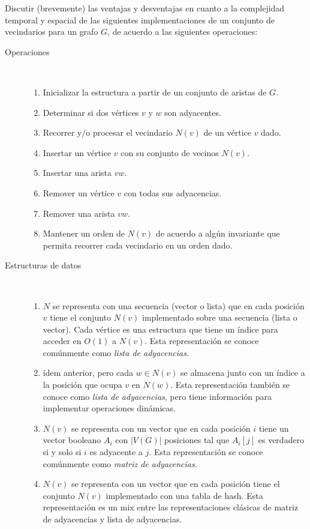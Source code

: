 

 \item\Obligatorio Discutir (brevemente) las ventajas y desventajas en cuanto a la complejidad temporal y espacial de las siguientes implementaciones de un conjunto de vecindarios para un grafo $G$, de acuerdo a las siguientes operaciones:
 \begin{description}
  \item [Operaciones] ~
  \begin{enumerate}
   \item Inicializar la estructura a partir de un conjunto de aristas de $G$.
   \item Determinar si dos vértices $v$ y $w$ son adyacentes.
   \item Recorrer y/o procesar el vecindario $N(v)$ de un vértice $v$ dado.
   \item Insertar un vértice $v$ con su conjunto de vecinos $N(v)$.
   \item Insertar una arista $vw$.
   \item Remover un vértice $v$ con todas sus adyacencias.
   \item Remover una arista $vw$.
   \item Mantener un orden de $N(v)$ de acuerdo a algún invariante que permita recorrer cada vecindario en un orden dado.
  \end{enumerate}
  \item [Estructuras de datos] ~
  \begin{enumerate}
   \item $N$ se representa con una secuencia (vector o lista) que en cada posición $v$ tiene el conjunto $N(v)$ implementado sobre una secuencia (lista o vector).  Cada vértice es una estructura que tiene un índice para acceder en $O(1)$ a $N(v)$.  Esta representación se conoce comúnmente como \emph{lista de adyacencias}.
   \item ídem anterior, pero cada $w \in N(v)$ se almacena junto con un índice a la posición que ocupa $v$ en $N(w)$.  Esta representación también se conoce como \emph{lista de adyacencias}, pero tiene información para implementar operaciones dinámicas.
   \item $N(v)$ se representa con un vector que en cada posición $i$ tiene un vector booleano $A_i$ con $|V(G)|$ posiciones tal que $A_i[j]$ es verdadero si y solo si $i$ es adyacente a $j$.  Esta representación se conoce comúnmente como \emph{matriz de adyacencias}.
   \item $N(v)$ se representa con un vector que en cada posición tiene el conjunto $N(v)$ implementado con una tabla de hash.  Esta representación es un mix entre las representaciones clásicas de matriz de adyacencias y lista de adyacencias.
  \end{enumerate}
 \end{description}



